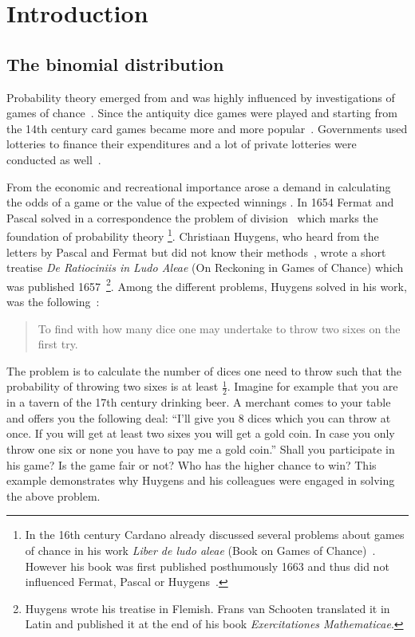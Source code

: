 \chapter{Introduction}

\section{The binomial distribution}


 Probability theory emerged from and was highly influenced by investigations of games of chance~\cite[p. 4]{hald1}. Since the antiquity dice games were played and starting from the 14th century card games became more and more popular~\cite[pp. 33-34]{hald1}. Governments used lotteries to finance their expenditures and a lot of private lotteries were conducted as well~\cite[p. 34]{hald1}.


From the economic and recreational importance arose a demand in calculating the odds of a game or the value of the expected winnings . In 1654 Fermat and Pascal solved in a correspondence the problem of division~\cite[pp. 42-80]{hald1} which marks the foundation of probability theory \footnote{In the 16th century Cardano already discussed several problems about games of chance in his work \emph{Liber de ludo aleae} (Book on Games of Chance)~\cite[pp. 33-41]{hald1}. However his book was first published posthumously 1663 and thus did not influenced Fermat, Pascal or Huygens~\cite[p. vii]{bernoulli}.}. Christiaan Huygens, who heard from the letters by Pascal and Fermat but did not know their methods~\cite[p. vii]{bernoulli}, wrote a short treatise \emph{De Ratiociniis in Ludo Aleae} (On Reckoning in Games of Chance) which was published 1657~\cite[p. vii]{bernoulli}\footnote{Huygens wrote his treatise in Flemish. Frans van Schooten translated it in Latin and published it at the end of his book \emph{Exercitationes Mathematicae}.}. Among the different problems, Huygens solved in his work, was the following~\cite[p. 163]{bernoulli}:

\begin{quotation}
  To find with how many dice one may undertake to throw two sixes on the first try.
\end{quotation}

The problem is to calculate the number of dices one need to throw such that the probability of throwing two sixes is at least $\tfrac 12$. Imagine for example that you are in a tavern of the 17th century drinking beer. A merchant comes to your table and offers you the following deal: ``I'll give you $8$ dices which you can throw at once. If you will get at least two sixes you will get a gold coin. In case you only throw one six or none you have to pay me a gold coin.'' Shall you participate in his game? Is the game fair or not? Who has the higher chance to win? This example demonstrates why Huygens and his colleagues were engaged in solving the above problem. 

